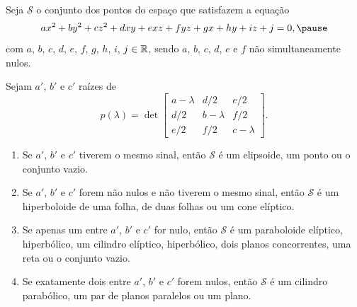 \documentclass{beamer}
\begin{document}
\begin{frame}
    \begin{teorema}
        Seja $\mathcal{S}$ \pause o conjunto dos pontos do espaço \pause que satisfazem a equação\pause
        \[
            ax^2 + by^2 + cz^2 + dxy + exz + fyz + gx + hy + iz + j = 0,\pause
        \]
        com $a$, $b$, $c$, $d$, $e$, $f$, $g$, $h$, $i$, $j \in \mathbb{R}$, \pause sendo $a$, $b$, $c$, $d$, $e$ e $f$ não simultaneamente nulos.
    \end{teorema}
\end{frame}

\begin{frame}
    \begin{teorema}
        Sejam $a'$, \pause $b'$ \pause e $c'$ \pause raízes de\pause
        \[
            p(\lambda) = \det \begin{bmatrix}
                a - \lambda & d/2         & e/2         \\
                d/2         & b - \lambda & f/2         \\
                e/2         & f/2         & c - \lambda
            \end{bmatrix}.
        \]\pause
        \begin{enumerate}[label=({\roman*})]
            \item Se $a'$, \pause $b'$ \pause e $c'$ \pause tiverem o mesmo sinal, \pause então $\mathcal{S}$ \pause é um elipsoide, \pause um ponto \pause ou o conjunto vazio.\pause
            \item Se $a'$, \pause $b'$ \pause e $c'$ \pause forem não nulos \pause e não tiverem o mesmo sinal, \pause então $\mathcal{S}$ \pause é um hiperboloide de uma folha, \pause de duas folhas \pause ou um cone elíptico.\pause
            \item Se apenas um \pause entre $a'$, \pause $b'$ \pause e $c'$ \pause for nulo, \pause então $\mathcal{S}$ \pause é um paraboloide elíptico, \pause hiperbólico, \pause um cilindro elíptico, \pause hiperbólico, \pause dois planos concorrentes, \pause uma reta \pause ou o conjunto vazio.\pause
            \item Se exatamente dois \pause entre $a'$, \pause $b'$ \pause e $c'$ \pause forem nulos, \pause então $\mathcal{S}$ \pause é um cilindro parabólico, \pause um par de planos paralelos \pause ou um plano.
        \end{enumerate}
    \end{teorema}
\end{frame}
\end{document}
